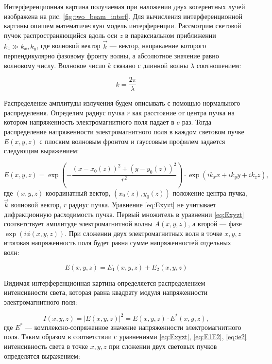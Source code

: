 Интерференционная картина получаемая при наложении двух когерентных лучей изображена на рис. \ref{fig:two_beam_interf}. Для вычисления интерференционной картины опишем математическую модель интерференции. Рассмотрим световой пучок распространяющийся вдоль оси $z$ в параксиальном приближении $k_z \gg k_x, k_y$, где волновой вектор $\vec{k}$ --- вектор, направление которого перпендикулярно фазовому фронту волны, а абсолютное значение равно волновому числу. Волновое число $k$ связано с длинной волны $\lambda$ соотношением:

\begin{equation*}
    k = \frac{2\pi}{\lambda}
\end{equation*}

Распределение амплитуды излучения будем описывать с помощью нормального распределения. Определим радиус пучка $r$ как расстояние от центра пучка на котором напряженность электромагнитного поля падает в $e$ раз. 
Тогда распределение напряженности электромагнитного поля в каждом световом пучке $E(x, y, z)$ с плоским волновым фронтом и гауссовым профилем задается следующим выражением: 

\begin{equation}
    E(x,y,z) = \exp \left(-\frac{(x-x_0(z))^2+(y-y_0(z))^2}{r^2} \right) \cdot \exp \left(i k_xx+ik_yy+ik_zz\right),
\label{eq:Exyzt}
\end{equation}
где $(x,y,z)$ координатный вектор, $(x_0(z),y_0(z))$ положение центра пучка, $\vec{k}$ волновой вектор, $r$ радиус пучка. Уравнение \eqref{eq:Exyzt} не учитывает дифракционную расходимость пучка. 
Первый множитель в уравнении \eqref{eq:Exyzt} соответствует амплитуде электромагнитной волны $A(x,y,z)$, а второй --- фазе $\exp(i\phi(x,y,z))$. 
При сложении двух электромагнитных волн в точке $x, y, z$ итоговая напряженность поля будет равна сумме напряженностей отдельных волн: 

\begin{equation}
    E(x, y, z) = E_1(x, y, z) + E_2(x, y, z)
\label{eq:E1E2}
\end{equation}

Видимая интерференционная картина определяется распределением интенсивности света, которая равна квадрату модуля напряженности электромагнитного поля: 

\begin{equation}
    I(x, y, z) = |E(x, y, z)|^2 = E(x,y,z) \cdot E^*(x,y,z),
\label{eq:ie2}
\end{equation}
где $E^*$ --- комплексно-сопряженное значение напряженности электромагнитного поля. Таким образом в соответствии с уравнениями \eqref{eq:Exyzt}, \eqref{eq:E1E2}, \eqref{eq:ie2} интенсивность света в точке $x, y, z$ при сложении двух световых пучков определятся выражением: 

